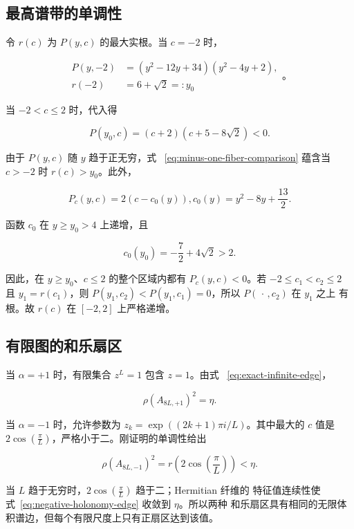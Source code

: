 \subsection{最高谱带的单调性}

令 \(r(c)\) 为 \(P(y,c)\) 的最大实根。当 \(c=-2\) 时，

\begin{equation}
\label{eq:minus-one-fiber-factorization}
\begin{aligned}
P(y,-2)&=(y^{2}-12y+34)(y^{2}-4y+2), \\
r(-2)&=6+\sqrt{2}=:y_{0}
\end{aligned}
\text{。}
\end{equation}

当 \(-2<c\leq2\) 时，代入得

\begin{equation}
\label{eq:minus-one-fiber-comparison}
P(y_{0},c)=(c+2)(c+5-8\sqrt{2})<0.
\end{equation}

由于 \(P(y,c)\) 随 \(y\) 趋于正无穷，式~
\eqref{eq:minus-one-fiber-comparison} 蕴含当 \(c>-2\) 时
\(r(c)>y_0\)。此外，

\begin{equation}
\label{eq:floquet-c-derivative}
P_c(y,c)=2(c-c_{0}(y)),       c_{0}(y)=y^{2}-8y+\frac{13}{2}.
\end{equation}

函数 \(c_0\) 在 \(y\geq y_0>4\) 上递增，且

\begin{equation}
c_{0}(y_{0})=-\frac{7}{2}+4\sqrt{2}>2.
\end{equation}

因此，在 \(y\geq y_0\)、\(c\leq2\) 的整个区域内都有 \(P_c(y,c)<0\)。若
\(-2\leq c_1<c_2\leq2\) 且 \(y_1=r(c_1)\)，则
\(P(y_1,c_2)<P(y_1,c_1)=0\)，所以 \(P(\,\cdot\,,c_2)\) 在 \(y_1\) 之上
有根。故 \(r(c)\) 在 \([-2,2]\) 上严格递增。

\subsection{有限图的和乐扇区}

当 \(\alpha=+1\) 时，有限集合 \(z^L=1\) 包含 \(z=1\)。由式~
\eqref{eq:exact-infinite-edge}，

\begin{equation}
\label{eq:positive-holonomy-edge}
\rho(A_{8L,+1})^{2}=\eta.
\end{equation}

当 \(\alpha=-1\) 时，允许参数为
\(z_k=\exp((2k+1)\pi i/L)\)。其中最大的 \(c\) 值是
\(2\cos(\frac{\pi}{L})\)，严格小于二。刚证明的单调性给出

\begin{equation}
\label{eq:negative-holonomy-edge}
\rho(A_{8L,-1})^{2}=r(2\cos(\frac{\pi}{L}))<\eta.
\end{equation}

当 \(L\) 趋于无穷时，\(2\cos(\frac{\pi}{L})\) 趋于二；Hermitian 纤维的
特征值连续性使式~\eqref{eq:negative-holonomy-edge} 收敛到 \(\eta\)。所以两种
和乐扇区具有相同的无限体积谱边，但每个有限尺度上只有正扇区达到该值。
